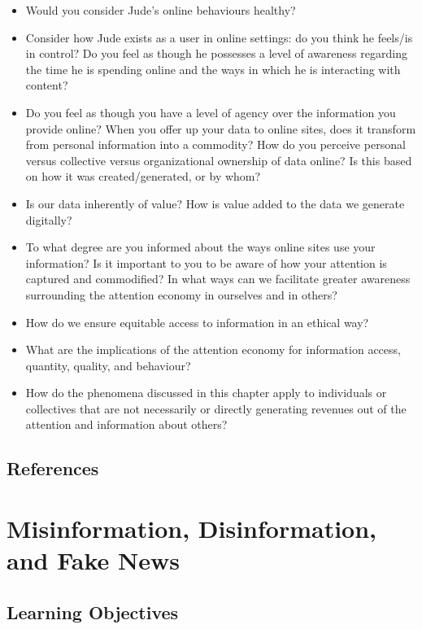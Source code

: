\documentclass[
  letterpaper,
  DIV=11,
  numbers=noendperiod]{scrreprt}
\begin{document}
\begin{itemize}
\item
  Would you consider Jude's online behaviours healthy?
\item
  Consider how Jude exists as a user in online settings: do you think he
  feels/is in control? Do you feel as though he possesses a level of
  awareness regarding the time he is spending online and the ways in
  which he is interacting with content?
\item
  Do you feel as though you have a level of agency over the information
  you provide online? When you offer up your data to online sites, does
  it transform from personal information into a commodity? How do you
  perceive personal versus collective versus organizational ownership of
  data online? Is this based on how it was created/generated, or by
  whom?
\item
  Is our data inherently of value? How is value added to the data we
  generate digitally?
\item
  To what degree are you informed about the ways online sites use your
  information? Is it important to you to be aware of how your attention
  is captured and commodified? In what ways can we facilitate greater
  awareness surrounding the attention economy in ourselves and in
  others?
\item
  How do we ensure equitable access to information in an ethical way?
\item
  What are the implications of the attention economy for information
  access, quantity, quality, and behaviour?
\item
  How do the phenomena discussed in this chapter apply to individuals or
  collectives that are not necessarily or directly generating revenues
  out of the attention and information about others?
\end{itemize}

\section{References}\label{references-7}


\chapter{Misinformation, Disinformation, and Fake
News}\label{misinformation-disinformation-and-fake-news}

\section{Learning Objectives}\label{learning-objectives-6}
\end{document}

